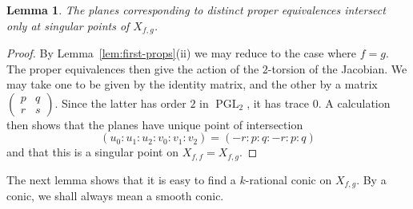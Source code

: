 \documentclass[12pt]{amsart}
\newcommand{\PGL}{\operatorname{PGL}}
\newtheorem{Lemma}[Proposition]{Lemma}
\theoremstyle{definition}
\begin{document}
\begin{Lemma}
\label{lem:2planes}
  The planes corresponding to distinct proper
  equivalences intersect only at singular points of $X_{f,g}$.
\end{Lemma}
\begin{proof}
  By Lemma~\ref{lem:first-props}(ii) we may reduce to the case where
  $f=g$. The proper equivalences then give the action of the
  $2$-torsion of the Jacobian.  We may take one to be given by the
  identity matrix, and the other by a matrix
  $(\begin{smallmatrix} p & q \\ r & s \end{smallmatrix})$.  Since the
  latter has order $2$ in $\PGL_2$, it has trace $0$.  A calculation
  then shows that the planes have unique point of intersection
  \begin{equation}
    \label{singpt}
    (u_0:u_1:u_2:v_0:v_1:v_2) = (-r : p : q : -r : p : q)
  \end{equation}
  and that this is a singular point on $X_{f,f} = X_{f,g}$.
\end{proof}

The next lemma shows that it is easy to find a $k$-rational conic on
$X_{f,g}$. By a conic, we shall always mean a smooth conic.
\end{document}
